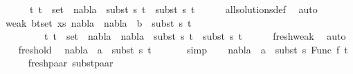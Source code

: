 \begin{isabellebody}
\ \ \ \ \ {\isachardoublequoteopen}{\isasymforall}\ {\isacharparenleft}{\kern0pt}t{}{\isacharcomma}{\kern0pt}\ t{}{\isacharparenright}{\kern0pt}\ {\isasymin}\ set\ {\isacharbrackleft}{\kern0pt}{\isacharbrackright}{\kern0pt}{\isachardot}{\kern0pt}\ nabla{}\ {\isasymturnstile}\ subst\ s{}\ t{}\ {\isasymapprox}\ subst\ s{}\ t{}{\isachardoublequoteclose}\isanewline
\ \ \ \ \isamarkupfalse%
\ all{\isacharunderscore}{\kern0pt}solutions{\isacharunderscore}{\kern0pt}def\ \isamarkupfalse%
\ auto\isanewline
\ \ \isamarkupfalse%
\ weak{}{\isacharcolon}{\kern0pt}\ {\isachardoublequoteopen}{\isasymforall}{\isacharparenleft}{\kern0pt}b{\isacharcomma}{\kern0pt}t{\isacharparenright}{\kern0pt}{\isasymin}set\ xs{\isachardot}{\kern0pt}\ {\isacharparenleft}{\kern0pt}nabla{}\ {\isasymunion}\ nabla{}{\isacharparenright}{\kern0pt}\ {\isasymturnstile}\ b\ {\isasymsharp}\ subst\ s{}\ t{\isachardoublequoteclose}\isanewline
\ \ \ \ \ \ \ \ {\isachardoublequoteopen}{\isasymforall}\ {\isacharparenleft}{\kern0pt}t{}{\isacharcomma}{\kern0pt}\ t{}{\isacharparenright}{\kern0pt}\ {\isasymin}\ set\ {\isacharbrackleft}{\kern0pt}{\isacharbrackright}{\kern0pt}{\isachardot}{\kern0pt}\ {\isacharparenleft}{\kern0pt}nabla{}\ {\isasymunion}\ nabla{}{\isacharparenright}{\kern0pt}\ {\isasymturnstile}\ subst\ s{}\ t{}\ {\isasymapprox}\ subst\ s{}\ t{}{\isachardoublequoteclose}\isanewline
\ \ \ \ \isamarkupfalse%
\ fresh{\isacharunderscore}{\kern0pt}weak\ \isamarkupfalse%
\ auto\isanewline
\ \ \isamarkupfalse%
\ fresh{\isacharunderscore}{\kern0pt}old\ \isamarkupfalse%
\ {\isachardoublequoteopen}nabla{}\ {\isasymturnstile}\ a\ {\isasymsharp}\ subst\ s{}\ t{\isacharprime}{\kern0pt}{\isachardoublequoteclose}\ \isanewline
\ \ \ \ \isamarkupfalse%
\ simp\isanewline
\ \ \isamarkupfalse%
\ {\isachardoublequoteopen}nabla{}\ {\isasymturnstile}\ a\ {\isasymsharp}\ subst\ s{}\ {\isacharparenleft}{\kern0pt}Func\ f\ t{\isacharprime}{\kern0pt}{\isacharparenright}{\kern0pt}{\isachardoublequoteclose}\isanewline
\ \ \ \ \isamarkupfalse%
\ fresh{\isacharunderscore}{\kern0pt}paar\ subst{\isacharunderscore}{\kern0pt}paar\ \isamarkupfalse%

\end{isabellebody}
